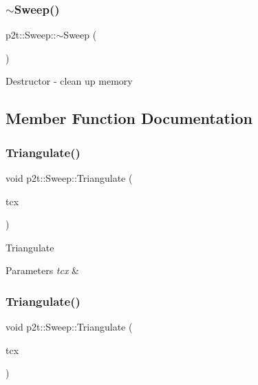 \subsubsection{\texorpdfstring{$\sim$\+Sweep()}{~Sweep()}\hspace{0.1cm}{\footnotesize\ttfamily [2/2]}}
{\footnotesize\ttfamily p2t\+::\+Sweep\+::$\sim$\+Sweep (\begin{DoxyParamCaption}{ }\end{DoxyParamCaption})}

Destructor -\/ clean up memory 

\subsection{Member Function Documentation}
\mbox{\label{classp2t_1_1Sweep_a1b7060836f00801c4dbb0a529d78628a}} 
\subsubsection{\texorpdfstring{Triangulate()}{Triangulate()}\hspace{0.1cm}{\footnotesize\ttfamily [1/2]}}
{\footnotesize\ttfamily void p2t\+::\+Sweep\+::\+Triangulate (\begin{DoxyParamCaption}\item[{\hyperlink{classp2t_1_1SweepContext}{Sweep\+Context} \&}]{tcx }\end{DoxyParamCaption})}

Triangulate


\begin{DoxyParams}{Parameters}
{\em tcx} & \\
\hline
\end{DoxyParams}
\mbox{\label{classp2t_1_1Sweep_a1b7060836f00801c4dbb0a529d78628a}} 
\subsubsection{\texorpdfstring{Triangulate()}{Triangulate()}\hspace{0.1cm}{\footnotesize\ttfamily [2/2]}}
{\footnotesize\ttfamily void p2t\+::\+Sweep\+::\+Triangulate (\begin{DoxyParamCaption}\item[{\hyperlink{classp2t_1_1SweepContext}{Sweep\+Context} \&}]{tcx }\end{DoxyParamCaption})}

